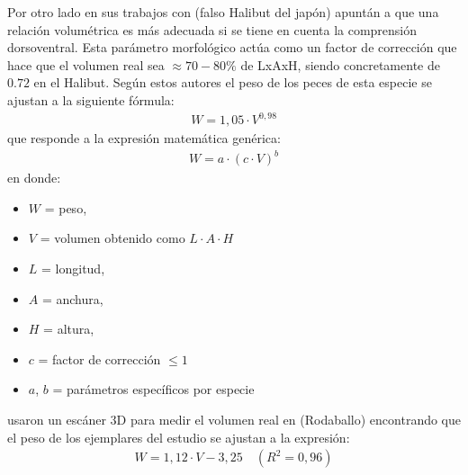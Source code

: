 \documentclass[a4paper,10pt,spanish]{jupyterBook}
\begin{document}
\sphinxAtStartPar
Por otro lado  en sus trabajos con  (falso Halibut del japón) apuntán a que una relación volumétrica es más adecuada si se tiene en cuenta la comprensión dorsoventral. Esta parámetro morfológico actúa como un factor de corrección que hace que el volumen real sea \(\approx70-80\%\) de LxAxH, siendo concretamente de \(0.72\) en el Halibut. Según estos autores el peso de los peces de esta especie se ajustan a la siguiente fórmula:
\begin{equation*}
\begin{split}W=1,05\cdot V^{0,98}\end{split}
\end{equation*}
\sphinxAtStartPar
que responde a la expresión matemática genérica:
\begin{equation}\label{equation:content/03/Coeficientes:eq_peso-volumen}
\begin{split}W=a\cdot (c\cdot V)^b\end{split}
\end{equation}
\sphinxAtStartPar
en donde:
\begin{itemize}
\item {}
\sphinxAtStartPar
\(W\) = peso,

\item {}
\sphinxAtStartPar
\(V\) = volumen obtenido como \(L\cdot A \cdot H\)

\item {}
\sphinxAtStartPar
\(L\) = longitud,

\item {}
\sphinxAtStartPar
\(A\) = anchura,

\item {}
\sphinxAtStartPar
\(H\) = altura,

\item {}
\sphinxAtStartPar
\(c\) = factor de corrección \(\leq 1\)

\item {}
\sphinxAtStartPar
\(a\), \(b\) = parámetros específicos por especie

\end{itemize}

\sphinxAtStartPar
{} usaron un escáner 3D para medir el volumen real en  (Rodaballo) encontrando que el peso de los ejemplares del estudio se ajustan a la expresión:
\begin{equation*}
\begin{split}W=1,12\cdot V-3,25\quad(R^{2}=0,96)\end{split}
\end{equation*}
\end{document}
